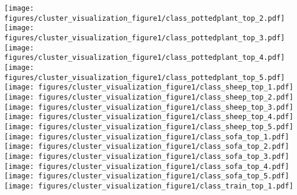 \documentclass{article}
\begin{document}
\begin{figure*}[htbp]
\texttt{[image: figures/cluster\_visualization\_figure1/class\_pottedplant\_top\_2.pdf]}\hspace{-0.12cm}
\texttt{[image: figures/cluster\_visualization\_figure1/class\_pottedplant\_top\_3.pdf]}\hspace{-0.12cm}
\texttt{[image: figures/cluster\_visualization\_figure1/class\_pottedplant\_top\_4.pdf]}\hspace{-0.12cm}
\texttt{[image: figures/cluster\_visualization\_figure1/class\_pottedplant\_top\_5.pdf]}\vspace{0.2cm}\\
\texttt{[image: figures/cluster\_visualization\_figure1/class\_sheep\_top\_1.pdf]}\hspace{-0.12cm}
\texttt{[image: figures/cluster\_visualization\_figure1/class\_sheep\_top\_2.pdf]}\hspace{-0.12cm}
\texttt{[image: figures/cluster\_visualization\_figure1/class\_sheep\_top\_3.pdf]}\hspace{-0.12cm}
\texttt{[image: figures/cluster\_visualization\_figure1/class\_sheep\_top\_4.pdf]}\hspace{-0.12cm}
\texttt{[image: figures/cluster\_visualization\_figure1/class\_sheep\_top\_5.pdf]}\hspace{0.2cm}
\texttt{[image: figures/cluster\_visualization\_figure1/class\_sofa\_top\_1.pdf]}\hspace{-0.12cm}
\texttt{[image: figures/cluster\_visualization\_figure1/class\_sofa\_top\_2.pdf]}\hspace{-0.12cm}
\texttt{[image: figures/cluster\_visualization\_figure1/class\_sofa\_top\_3.pdf]}\hspace{-0.12cm}
\texttt{[image: figures/cluster\_visualization\_figure1/class\_sofa\_top\_4.pdf]}\hspace{-0.12cm}
\texttt{[image: figures/cluster\_visualization\_figure1/class\_sofa\_top\_5.pdf]}\vspace{0.2cm}\\
\texttt{[image: figures/cluster\_visualization\_figure1/class\_train\_top\_1.pdf]}\hspace{-0.12cm}

\end{figure*}
\end{document}

